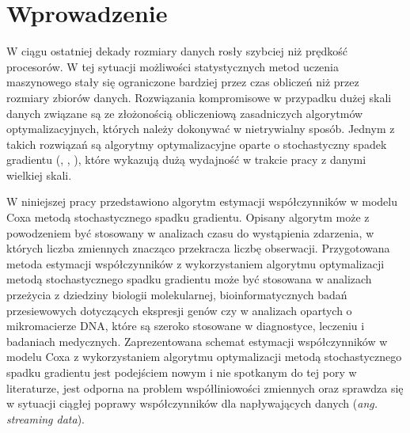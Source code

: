 \chapter*{Wprowadzenie}

W ciągu ostatniej dekady rozmiary danych rosły szybciej niż prędkość procesorów. W tej sytuacji możliwości statystycznych metod uczenia maszynowego stały się ograniczone bardziej przez czas obliczeń niż przez rozmiary zbiorów danych. Rozwiązania kompromisowe w przypadku dużej skali danych związane są ze złożonością obliczeniową zasadniczych algorytmów optymalizacyjnych, których należy dokonywać w nietrywialny sposób. Jednym z takich rozwiązań są algorytmy optymalizacyjne oparte o stochastyczny spadek gradientu (\cite{bott1}, \cite{bott2}, \cite{widrow2}), które wykazują dużą wydajność w trakcie pracy z danymi wielkiej skali.

W niniejszej pracy przedstawiono algorytm estymacji współczynników w modelu Coxa metodą stochastycznego spadku gradientu. Opisany algorytm może z powodzeniem być stosowany w analizach czasu do wystąpienia zdarzenia, w których liczba zmiennych znacząco przekracza liczbę obserwacji. Przygotowana metoda estymacji współczynników z wykorzystaniem algorytmu optymalizacji metodą stochastycznego spadku gradientu może być stosowana w analizach przeżycia z dziedziny biologii molekularnej, bioinformatycznych badań przesiewowych dotyczących ekspresji genów czy w analizach opartych o mikromacierze DNA, które są szeroko stosowane w diagnostyce, leczeniu i badaniach medycznych. Zaprezentowana schemat estymacji współczynników w modelu Coxa z wykorzystaniem algorytmu optymalizacji metodą stochastycznego spadku gradientu jest podejściem nowym i nie spotkanym do tej pory w literaturze, jest odporna na problem współliniowości zmiennych oraz sprawdza się w sytuacji ciągłej poprawy współczynników dla napływających danych (\textit{ang. streaming data}).

